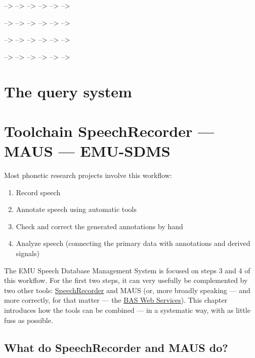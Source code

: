 \documentclass[]{book}
\providecommand{\tightlist}{%
  \setlength{\itemsep}{0pt}\setlength{\parskip}{0pt}}
\theoremstyle{definition}
\theoremstyle{definition}
\theoremstyle{definition}
\theoremstyle{remark}
\begin{document}
--\textgreater{} --\textgreater{} --\textgreater{} --\textgreater{}
--\textgreater{} --\textgreater{}

--\textgreater{} --\textgreater{} --\textgreater{} --\textgreater{}
--\textgreater{} --\textgreater{}

--\textgreater{} --\textgreater{} --\textgreater{} --\textgreater{}
--\textgreater{} --\textgreater{}

--\textgreater{} --\textgreater{} --\textgreater{} --\textgreater{}
--\textgreater{} --\textgreater{}

\chapter{The query system}\label{the-query-system}

\chapter{Toolchain SpeechRecorder --- MAUS ---
EMU-SDMS}\label{toolchain-speechrecorder-maus-emu-sdms}

Most phonetic research projects involve this workflow:

\begin{enumerate}
\def\labelenumi{\arabic{enumi}.}
\tightlist
\item
  Record speech
\item
  Annotate speech using automatic tools
\item
  Check and correct the generated annotations by hand
\item
  Analyze speech (connecting the primary data with annotations and
  derived signals)
\end{enumerate}

The EMU Speech Database Management System is focused on steps 3 and 4 of
this workflow. For the first two steps, it can very usefully be
complemented by two other tools:
\href{http://www.speechrecorder.org/}{SpeechRecorder} and MAUS (or, more
broadly speaking --- and more correctly, for that matter --- the
\href{https://clarin.phonetik.uni-muenchen.de/BASWebServices}{BAS Web
Services}). This chapter introduces how the tools can be combined --- in
a systematic way, with as little fuss as possible.

\section{What do SpeechRecorder and MAUS
do?}\label{what-do-speechrecorder-and-maus-do}
\end{document}
